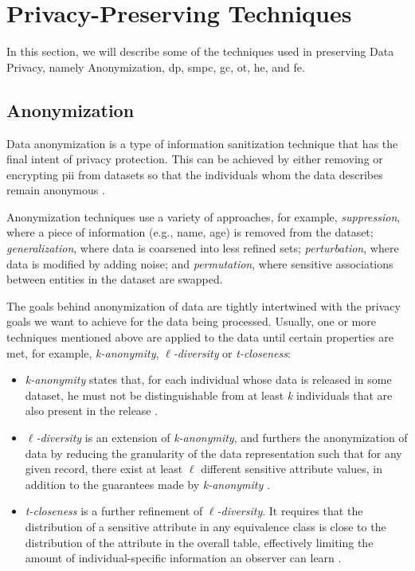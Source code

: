 \section{Privacy-Preserving Techniques}
\label{sec:PrivacyPreservingTechniques}


 In this section, we will describe some of the techniques used in preserving Data Privacy, namely Anonymization, \ac{dp}, \ac{smpc}, \ac{gc}, \ac{ot}, \ac{he}, and \ac{fe}.


\subsection{Anonymization}
\label{ssec:Anonymization}


Data anonymization is a type of information sanitization technique that has the final intent of privacy protection. This can be achieved by either removing or encrypting \ac{pii} from datasets so that the individuals whom the data describes remain anonymous \cite{raghunathan2013}.

Anonymization techniques use a variety of approaches, for example, \emph{suppression}, where a piece of information (e.g., name, age) is removed from the dataset; \emph{generalization}, where data is coarsened into less refined sets; \emph{perturbation}, where data is modified by adding noise; and \emph{permutation}, where sensitive associations between entities in the dataset are swapped.

The goals behind anonymization of data are tightly intertwined with the privacy goals we want to achieve for the data being processed. Usually, one or more techniques mentioned above are applied to the data until certain properties are met, for example, \textit{k-anonymity}, $\ell$\textit{-diversity} or \textit{t-closeness}:

\begin{itemize}
    \item \textit{k-anonymity} states that, for each individual whose data is released in some dataset, he must not be distinguishable from at least \textit{k} individuals that are also present in the release \cite{sweeney2002k}. 

    \item $\ell$\textit{-diversity} is an extension of \textit{k-anonymity}, and furthers the anonymization of data by reducing the granularity of the data representation such that for any given record, there exist at least $\ell$ different sensitive attribute values, in addition to the guarantees made by \textit{k-anonymity} \cite{machanavajjhala2007diversity}.

    \item \textit{t-closeness} is a further refinement of $\ell$\textit{-diversity}. It requires that the distribution of a sensitive attribute in any equivalence class is close to the distribution of the attribute in the overall table, effectively limiting the amount of individual-specific information an observer can learn \cite{li2007t}.  
\end{itemize} 


